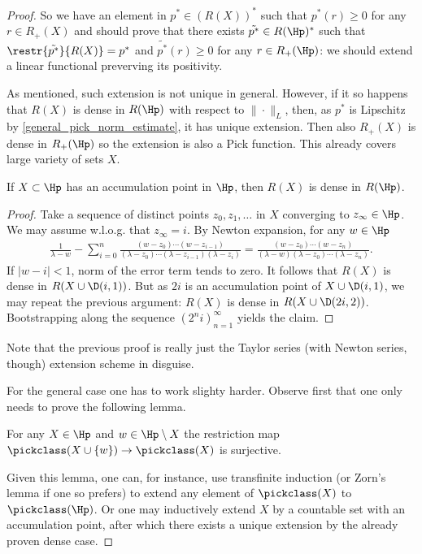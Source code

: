 \begin{proof}
	So we have an element in $p^{*} \in (R(X))^{*}$ such that $p^{*}(r) \geq 0$ for any $r \in R_{+}(X)$ and should prove that there exists $\tilde{p^{*}} \in R(\Hp)^{*}$ such that $\restr{\tilde{p^{*}}}{R(X)} = p^{*}$ and $\tilde{p^{*}}(r) \geq 0$ for any $r \in R_{+}(\Hp)$: we should extend a linear functional preverving its positivity.

	As mentioned, such extension is not unique in general. However, if it so happens that $R(X)$ is dense in $R(\Hp)$ with respect to $\|\cdot\|_{L}$, then, as $p^{*}$ is Lipschitz by \ref{general_pick_norm_estimate}, it has unique extension. Then also $R_{+}(X)$ is dense in $R_{+}(\Hp)$ so the extension is also a Pick function. This already covers large variety of sets $X$.
	\begin{lem}\label{pick_dual_dense}
		If $X \subset \Hp$ has an accumulation point in $\Hp$, then $R(X)$ is dense in $R(\Hp)$.
	\end{lem}
	\begin{proof}
		Take a sequence of distinct points $z_{0}, z_{1}, \ldots$ in $X$ converging to $z_{\infty} \in \Hp$. We may assume w.l.o.g. that $z_{\infty} = i$. By Newton expansion, for any $w \in \Hp$
		\begin{align*}
			\frac{1}{\lambda - w} - \sum_{i = 0}^{n} \frac{(w - z_{0}) \cdots (w - z_{i - 1})}{(\lambda - z_{0}) \cdots (\lambda - z_{i - 1}) (\lambda - z_{i})} = \frac{(w - z_{0}) \cdots (w - z_{n})}{(\lambda - w)(\lambda - z_{0}) \cdots (\lambda - z_{n})}.
		\end{align*}
		If $|w - i| < 1$, norm of the error term tends to zero. It follows that $R(X)$ is dense in $R(X \cup \D(i, 1))$. But as $2 i$ is an accumulation point of $X \cup \D(i, 1)$, we may repeat the previous argument: $R(X)$ is dense in $R(X \cup \D(2 i, 2))$. Bootstrapping along the sequence $(2^{n} i)_{n = 1}^{\infty}$ yields the claim.
	\end{proof}
	Note that the previous proof is really just the Taylor series (with Newton series, though) extension scheme in disguise.

	For the general case one has to work slighty harder. Observe first that one only needs to prove the following lemma.
	\begin{lem}\label{pick_one_point_extension}
		For any $X \in \Hp$ and $w \in \Hp \setminus X$ the restriction map $\pickclass(X \cup \{w\}) \to \pickclass(X)$ is surjective.
	\end{lem}
	Given this lemma, one can, for instance, use transfinite induction (or Zorn's lemma if one so prefers) to extend any element of $\pickclass(X)$ to $\pickclass(\Hp)$. Or one may inductively extend $X$ by a countable set with an accumulation point, after which there exists a unique extension by the already proven dense case.


\end{proof}
